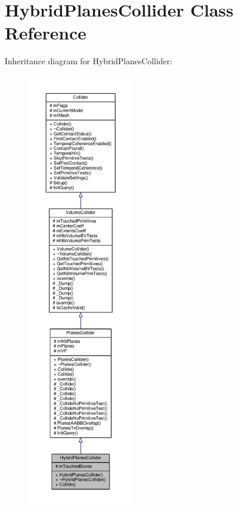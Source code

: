 \hypertarget{classHybridPlanesCollider}{}\section{Hybrid\+Planes\+Collider Class Reference}
\label{classHybridPlanesCollider}


Inheritance diagram for Hybrid\+Planes\+Collider\+:
\nopagebreak
\begin{figure}[H]
\begin{center}
\leavevmode
\includegraphics[height=550pt]{d1/d2f/classHybridPlanesCollider__inherit__graph}
\end{center}
\end{figure}


